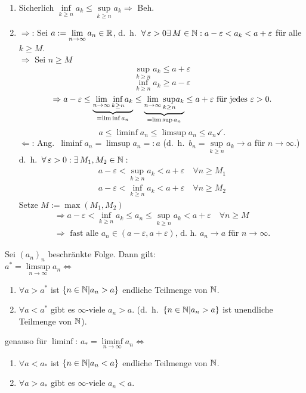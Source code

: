 \documentclass[../ana1.tex]{subfiles}
\begin{document}
\begin{bew}
	\begin{enumerate}
		\item Sicherlich \( \underset{k\geq n}{\inf}a_k \leq \underset{k\geq n}{\sup} a_k \Rightarrow \) Beh. \checkmark{}
		\item \glqq{}\(\Rightarrow \)\grqq{}: Sei \(a:= \lim\limits_{n\rightarrow\infty}a_n\in\mathbb{R} \), d.\ h.\  \( \forall \varepsilon > 0 \exists M\in\N: a-\varepsilon < a_k < a+ \varepsilon \) für alle \(k \geq M \).\\
		\( \Rightarrow \) Sei \(n\geq M\) 
		\[ \underset{k\geq n}{\sup} a_k \leq a+\varepsilon \]
		\[ \underset{k\geq n}{\inf} a_k \geq a-\varepsilon \]
		\[ \Rightarrow a-\varepsilon \leq \underbrace{\lim\limits_{n\rightarrow\infty}\underset{k\geq n}{\inf}a_k}_{=\liminf a_n} \leq \underbrace{\lim\limits_{n\rightarrow\infty}\underset{k\geq n}{\sup}a_k}_{=\limsup a_n} \leq a+\varepsilon \text{ für jedes } \varepsilon>0. \]
		\[ a\leq \liminf a_n \leq \limsup a_n \leq a_n \checkmark. \]
		\glqq{}\(\Leftarrow \)\grqq{}: Ang.\  \( \liminf a_n = \limsup a_n =: a \) (d.\ h.\  \(b_n =  \underset{k\geq n}{\sup} a_k \rightarrow a \) für \( n\rightarrow\infty \).)\\
		d.\ h.\  \( \forall \varepsilon>0: \exists M_1,M_2 \in\N: \)
		\begin{align*}
			a-\varepsilon < \underset{k\geq n}{\sup} a_k < a + \varepsilon \quad \forall n\geq M_1\\
			a-\varepsilon < \underset{k\geq n}{\inf} a_k < a + \varepsilon \quad \forall n\geq M_2
		\end{align*}
		Setze \(M := \max(M_1, M_2) \) \\
		\begin{align*}
			\Rightarrow a-\varepsilon < \underset{k\geq n}{\inf} a_k \leq a_n \leq \underset{k\geq n}{\sup} a_k < a + \varepsilon \quad \forall n\geq M\\
			\Rightarrow \text{ fast alle } a_n\in(a-\varepsilon,a+\varepsilon)\text{, d.\ h.\ }a_n\rightarrow a \text{ für } n\rightarrow \infty.
		\end{align*}
	\end{enumerate}
\end{bew}
\begin{satz}
	Sei \({(a_n)}_n\) beschränkte Folge. Dann gilt:\\
	\(a^* = \limsup\limits_{n\rightarrow\infty}a_n \Leftrightarrow \)
	\begin{enumerate}
		\item \(\forall a> a^* \) ist \( \{n\in\mathbb{N} |a_n>a \} \) endliche Teilmenge von \(\mathbb{N} \).
		\item \( \forall a<a^* \) gibt es \(\infty \)-viele \(a_n >a\). (d.\ h.\  \( \{ n\in\mathbb{N}|a_n>a \} \) ist unendliche Teilmenge von \(\mathbb{N} \)).
	\end{enumerate}
	genauso für \( \liminf \):
	\(a_* = \liminf\limits_{n\rightarrow\infty}a_n \Leftrightarrow \)
	\begin{enumerate}
		\item \(\forall a< a_* \) ist \( \{n\in\mathbb{N} |a_n<a \} \) endliche Teilmenge von \(\mathbb{N} \).
		\item \( \forall a>a_* \) gibt es \(\infty \)-viele \(a_n<a\).
	\end{enumerate}
\end{satz}
\end{document}
